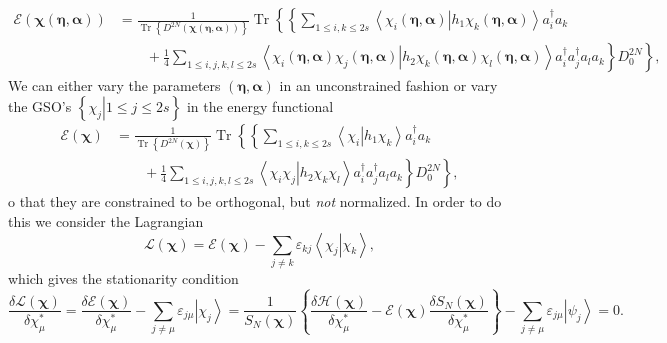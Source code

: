 \documentclass[aps,preprint]{revtex4}%
\begin{document}
\begin{align}
\mathcal{E}\left(  \mathbf{\chi}\left(  \mathbf{\eta,\alpha}\right)  \right)
&  =\frac{1}{\operatorname{Tr}\left\{  D^{2N}\left(  \mathbf{\chi}\left(
\mathbf{\eta,\alpha}\right)  \right)  \right\}  }\operatorname{Tr}\left\{
\left\{  \sum_{1\leq i,k\leq2s}\left\langle \left.  \chi_{i}\left(
\mathbf{\eta,\alpha}\right)  \right\vert h_{1}\chi_{k}\left(  \mathbf{\eta
,\alpha}\right)  \right\rangle a_{i}^{\dagger}a_{k}\right.  \right.
\nonumber\\
&  \qquad+\left.  \left.  \frac{1}{4}\sum_{1\leq i,j,k,l\leq2s}\left\langle
\left.  \chi_{i}\left(  \mathbf{\eta,\alpha}\right)  \chi_{j}\left(
\mathbf{\eta,\alpha}\right)  \right\vert h_{2}\chi_{k}\left(  \mathbf{\eta
,\alpha}\right)  \chi_{l}\left(  \mathbf{\eta,\alpha}\right)  \right\rangle
a_{i}^{\dagger}a_{j}^{\dagger}a_{l}a_{k}\right\}  D_{0}^{2N}\right\}  ,
\end{align}
We can either vary the parameters $\left(  \mathbf{\eta,\alpha}\right)  $ in
an unconstrained fashion or vary the GSO's $\left\{  \left.  \chi
_{j}\right\vert 1\leq j\leq2s\right\}  $ in the energy functional
\begin{align}
\mathcal{E}\left(  \mathbf{\chi}\right)   &  =\frac{1}{\operatorname{Tr}%
\left\{  D^{2N}\left(  \mathbf{\chi}\right)  \right\}  }\operatorname{Tr}%
\left\{  \left\{  \sum_{1\leq i,k\leq2s}\left\langle \left.  \chi
_{i}\right\vert h_{1}\chi_{k}\right\rangle a_{i}^{\dagger}a_{k}\right.
\right. \nonumber\\
&  \qquad+\left.  \left.  \frac{1}{4}\sum_{1\leq i,j,k,l\leq2s}\left\langle
\left.  \chi_{i}\chi_{j}\right\vert h_{2}\chi_{k}\chi_{l}\right\rangle
a_{i}^{\dagger}a_{j}^{\dagger}a_{l}a_{k}\right\}  D_{0}^{2N}\right\}  ,
\end{align}
o that they are constrained to be orthogonal, but \emph{not} normalized. In
order to do this we consider the Lagrangian
\begin{equation}
\mathcal{L}\left(  \mathbf{\chi}\right)  =\mathcal{E}\left(  \mathbf{\chi
}\right)  -\sum_{j\neq k}\varepsilon_{kj}\left\langle \left.  \chi
_{j}\right\vert \chi_{k}\right\rangle ,
\end{equation}
which gives the stationarity condition
\begin{equation}
\frac{\delta\mathcal{L}\left(  \mathbf{\chi}\right)  }{\delta\chi_{\mu}^{\ast
}}=\frac{\delta\mathcal{E}\left(  \mathbf{\chi}\right)  }{\delta\chi_{\mu
}^{\ast}}-\sum_{j\neq\mu}\varepsilon_{j\mu}\left\vert \chi_{j}\right\rangle
=\frac{1}{S_{N}\left(  \mathbf{\chi}\right)  }\left\{  \frac{\delta
\mathcal{H}\left(  \mathbf{\chi}\right)  }{\delta\chi_{\mu}^{\ast}%
}-\mathcal{E}\left(  \mathbf{\chi}\right)  \frac{\delta S_{N}\left(
\mathbf{\chi}\right)  }{\delta\chi_{\mu}^{\ast}}\right\}  -\sum_{j\neq\mu
}\varepsilon_{j\mu}\left\vert \psi_{j}\right\rangle =0.
\end{equation}%
\end{document}
